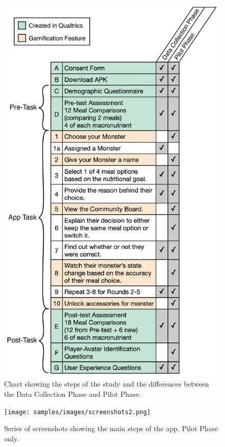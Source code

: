 \begin{figure}[!ht]
\includegraphics[scale=0.33]{samples/images/figure-2-02.png}
\caption{Chart showing the steps of the study and the differences between the Data Collection Phase and Pilot Phase.}
\label{fig:phasechart}
\end{figure}


\begin{figure}[!ht]
\texttt{[image: samples/images/screenshots2.png]}
\caption{Series of screenshots showing the main steps of the app. Pilot Phase only. }
\label{fig:screenshots}
\end{figure}


